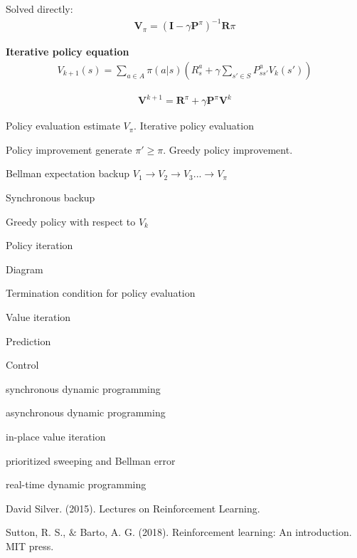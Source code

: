 \documentclass[journal]{IEEEtran}
\begin{document}
Solved directly:
\begin{align*}
\mathbf{V}_\pi = (\mathbf{I} - \gamma \mathbf{P}^\pi)^{-1}\mathbf{R}\pi
\end{align*}

\textbf{Iterative policy equation}
\begin{align*}
V_{k+1}(s) = \sum_{a\in A}\pi(a|s) \left(R_s^a + \gamma\sum_{s'\in S} P_{ss'}^a V_k(s')\right)
\end{align*}

\begin{align*}
\mathbf{V}^{k+1} = \mathbf{R}^\pi + \gamma\mathbf{P}^\pi\mathbf{V}^k
\end{align*}

Policy evaluation estimate $V_\pi$. Iterative policy evaluation

Policy improvement generate $\pi' \geq \pi$. Greedy policy improvement.

Bellman expectation backup $V_1 \rightarrow V_2 \rightarrow V_3 ...\rightarrow V_\pi$

Synchronous backup

Greedy policy with respect to $V_k$

Policy iteration

Diagram

Termination condition for policy evaluation

Value iteration

Prediction

Control

synchronous dynamic programming

asynchronous dynamic programming

in-place value iteration

prioritized sweeping and Bellman error

real-time dynamic programming

\ifCLASSOPTIONcaptionsoff
  \newpage
\fi

\begin{thebibliography}{1}

David Silver. (2015). Lectures on Reinforcement Learning.

Sutton, R. S., $\&$ Barto, A. G. (2018). Reinforcement learning: An introduction. MIT press.
	
\end{thebibliography}
\end{document}
